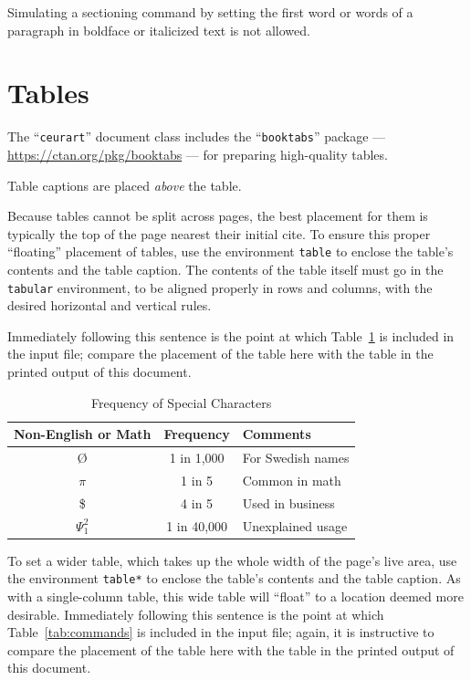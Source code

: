 \documentclass{ceurart}
\begin{document}
Simulating a sectioning command by setting the first word or words of
a paragraph in boldface or italicized text is not allowed.

\section{Tables}

The ``\verb|ceurart|'' document class includes the ``\verb|booktabs|''
package --- \url{https://ctan.org/pkg/booktabs} --- for preparing
high-quality tables.

Table captions are placed \textit{above} the table.

Because tables cannot be split across pages, the best placement for
them is typically the top of the page nearest their initial cite.  To
ensure this proper ``floating'' placement of tables, use the
environment \verb|table| to enclose the table's contents and the
table caption. The contents of the table itself must go in the
\verb|tabular| environment, to be aligned properly in rows and
columns, with the desired horizontal and vertical rules.

Immediately following this sentence is the point at which
Table~\ref{tab:freq} is included in the input file; compare the
placement of the table here with the table in the printed output of
this document.

\begin{table}
  \caption{Frequency of Special Characters}
  \label{tab:freq}
  \begin{tabular}{ccl}
    \toprule
    Non-English or Math&Frequency&Comments\\
    \midrule
    \O & 1 in 1,000& For Swedish names\\
    $\pi$ & 1 in 5& Common in math\\
    \$ & 4 in 5 & Used in business\\
    $\Psi^2_1$ & 1 in 40,000& Unexplained usage\\
  \bottomrule
\end{tabular}
\end{table}

To set a wider table, which takes up the whole width of the page's
live area, use the environment \verb|table*| to enclose the table's
contents and the table caption.  As with a single-column table, this
wide table will ``float'' to a location deemed more
desirable. Immediately following this sentence is the point at which
Table~\ref{tab:commands} is included in the input file; again, it is
instructive to compare the placement of the table here with the table
in the printed output of this document.
\end{document}
